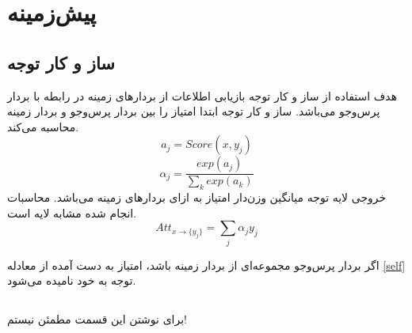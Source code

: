 
\chapter{پیش‌زمینه}
\thispagestyle{empty}

\section{ساز و کار توجه
}\label{attention}
هدف استفاده از ساز و کار توجه
بازیابی اطلاعات از بردارهای زمینه
در رابطه با بردار پرس‌وجو
می‌باشد. ساز و کار توجه ابتدا امتیاز 
را بین بردار پرس‌وجو 
و بردار زمینه
محاسبه می‌کند.
\begin{equation}
	a_j = Score(x, y_j)
\end{equation}
\begin{equation}
	\alpha_j = \frac{exp(a_j)}{\sum_{k} exp(a_k)}
\end{equation}
خروجی لایه توجه میانگین وزن‌دار امتیاز 
به ازای بردار‌های زمینه می‌باشد. محاسبات انجام شده مشابه لایه 
است.
\begin{equation}\label{self}
	Att_{x \to \{y_j\}} = \sum_{j} \alpha_jy_j
\end{equation}


اگر بردار پرس‌وجو
مجموعه‌ای از بردار زمینه
باشد، امتیاز به دست آمده از معادله
\ref{self}
 توجه به خود
  نامیده می‌شود.

\section{
}
برای نوشتن این قسمت مطمئن نیستم!

